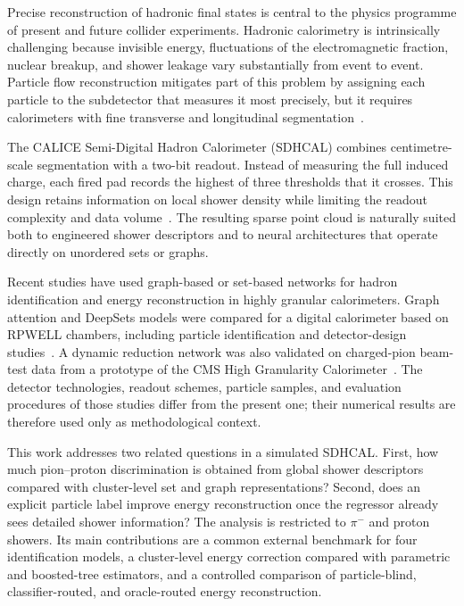 \documentclass[11pt,a4paper]{article}
\newcommand{\pim}{\ensuremath{\pi^-}}
\newcommand{\SDHCAL}{\textsc{SDHCAL}}
\begin{document}
Precise reconstruction of hadronic final states is central to the physics programme
of present and future collider experiments. Hadronic calorimetry is intrinsically
challenging because invisible energy, fluctuations of the electromagnetic fraction,
nuclear breakup, and shower leakage vary substantially from event to event. Particle
flow reconstruction mitigates part of this problem by assigning each particle to the
subdetector that measures it most precisely, but it requires calorimeters with fine
transverse and longitudinal segmentation~\cite{thomson2009pandora}.

The CALICE Semi-Digital Hadron Calorimeter (\SDHCAL) combines centimetre-scale
segmentation with a two-bit readout. Instead of measuring the full induced charge,
each fired pad records the highest of three thresholds that it crosses. This design
retains information on local shower density while limiting the readout complexity and
data volume~\cite{calice2015sdhcal,calice2016sdhcal}. The resulting sparse point cloud
is naturally suited both to engineered shower descriptors and to neural architectures
that operate directly on unordered sets or graphs.

Recent studies have used graph-based or set-based networks for hadron identification
and energy reconstruction in highly granular calorimeters. Graph attention and
DeepSets models were compared for a digital calorimeter based on RPWELL chambers,
including particle identification and detector-design studies~\cite{borysova2025dhcalgnn}.
A dynamic reduction network was also validated on charged-pion beam-test data from a
prototype of the CMS High Granularity Calorimeter~\cite{aamir2024hgcalgnn}. The
detector technologies, readout schemes, particle samples, and evaluation procedures
of those studies differ from the present one; their numerical results are therefore
used only as methodological context.

This work addresses two related questions in a simulated \SDHCAL. First, how much
pion--proton discrimination is obtained from global shower descriptors compared with
cluster-level set and graph representations? Second, does an explicit particle label
improve energy reconstruction once the regressor already sees detailed shower
information? The analysis is restricted to \pim{} and proton showers. Its main
contributions are a common external benchmark for four identification models, a
cluster-level energy correction compared with parametric and boosted-tree estimators,
and a controlled comparison of particle-blind, classifier-routed, and oracle-routed
energy reconstruction.
\end{document}
